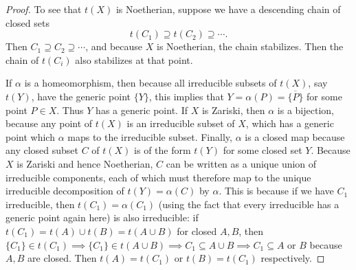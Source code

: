 \begin{proof}
	To see that $t(X) $ is Noetherian, suppose we have a descending chain of closed sets
	\[
		t(C_{1}) \supseteq t(C_{2}) \supseteq \cdots
	.\] 
	Then $C_{1} \supseteq C_{2} \supseteq \cdots $, and because $X $ is Noetherian, the chain stabilizes.
	Then the chain of $t(C_i) $ also stabilizes at that point.

	If $\alpha $ is a homeomorphism, then because all irreducible subsets of $t(X) $, say $t(Y) $, have the generic point $\{Y\}   $, this implies that $Y = \alpha(P) = \overline{\{P\} } $ for some point $P \in X $.
	Thus $Y $ has a generic point.
	If $X $ is Zariski, then $\alpha $ is a bijection, because any point of $t(X) $ is an irreducible subset of $X $, which has a generic point which $\alpha $ maps to the irreducible subset.
	Finally, $\alpha $ is a closed map because any closed subset $C $ of $t(X) $ is of the form $t(Y) $ for some closed set $Y $.
	Because $X $ is Zariski and hence Noetherian, $C $ can be written as a unique union of irreducible components, each of which must therefore map to the unique irreducible decomposition of $t(Y) = \alpha(C)$ by $\alpha $.
	This is because if we have $C_{1} $ irreducible, then $t(C_{1}) = \alpha(C_{1}) $ (using the fact that every irreducible has a generic point again here) is also irreducible: if $t(C_{1}) = t(A) \cup t(B) = t(A\cup B) $ for closed $A,B $, then $\{C_{1}\}  \in t(C_{1}) \implies \{C_{1}\}  \in t(A\cup B) \implies C_{1} \subseteq A\cup B \implies C_{1} \subseteq A$ or $B $ because $A,B $ are closed.
	Then $t(A) = t(C_{1}) $ or $t(B) = t(C_{1}) $ respectively.
\end{proof}

